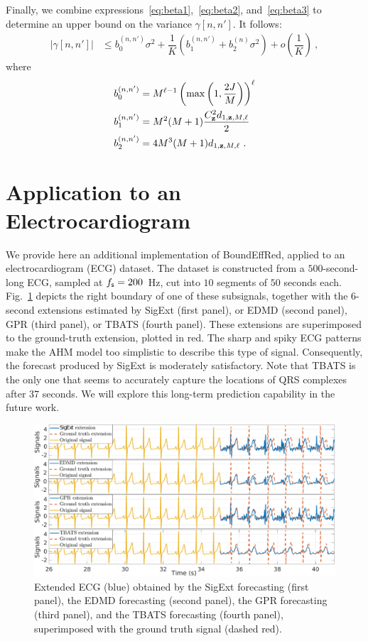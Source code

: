 \documentclass[journal,onecolumn]{IEEEtran}
\begin{document}
Finally, we combine expressions~\eqref{eq:beta1},~\eqref{eq:beta2}, and~\eqref{eq:beta3} to determine an upper bound on the variance $\gamma[n,n']$. It follows:
\begin{align*}
\left|\gamma[n,n']\right| &\leq b_0^{(n,n')}\sigma^2 + \dfrac{1}{K} \left( b_1^{(n,n')} + b_2^{(n)}\sigma^2\right) + o\left(\dfrac1K\right)\ ,
\end{align*}
where
\begin{align*}
b_0^{(n,n')} & =  M^{\ell-1}\left(\max\left(1,\frac{2J}{M}\right)\right)^{\ell} \\
b_1^{(n,n')} & = M^2(M+1)\dfrac{C_{\mathbf z}^2 d_{1,{\mathbf z},M,\ell}}{2} \\
b_2^{(n,n')} & = 4M^3(M+1)d_{1,{\mathbf z},M,\ell}  \ .
\end{align*}

\section{Application to an Electrocardiogram}
We provide here an additional implementation of {\sf BoundEffRed}, applied to an electrocardiogram (ECG) dataset. The dataset is constructed from a $500$-second-long ECG, sampled at $f_{\mathsf s}=200$~Hz, cut into $10$ segments of $50$ seconds each. Fig.~\ref{fig:ecg} depicts the right boundary of one of these subsignals, together with the $6$-second extensions estimated by {\sf SigExt} (first panel), or EDMD (second panel), GPR (third panel), or TBATS (fourth panel). These extensions are superimposed to the ground-truth extension, plotted in red. The sharp and spiky ECG patterns make the AHM model too simplistic to describe this type of signal. Consequently, the forecast produced by {\sf SigExt} is moderately satisfactory. Note that TBATS is the only one that seems to accurately capture the locations of QRS complexes after 37 seconds. We will explore this long-term prediction capability in the future work.

\begin{figure}
\includegraphics[width=\textwidth]{ECGforecast.eps}
\caption{Extended ECG (blue) obtained by the {\sf SigExt} forecasting (first panel), the EDMD forecasting (second panel), the GPR forecasting (third panel), and the TBATS forecasting (fourth panel), superimposed with the ground truth signal (dashed red).}
\label{fig:ecg}
\end{figure}
\end{document}
